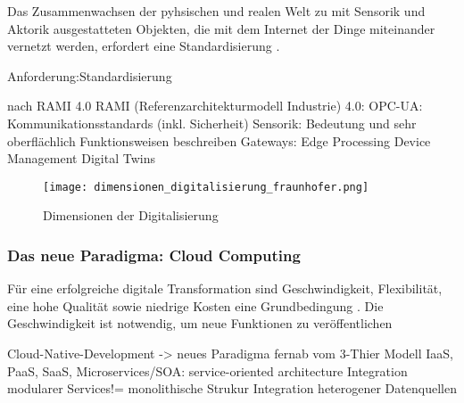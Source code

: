 Das Zusammenwachsen der pyhsischen und realen Welt zu mit Sensorik und Aktorik ausgestatteten Objekten, die mit dem Internet der Dinge miteinander vernetzt werden, erfordert eine Standardisierung \citep{BITKOM2015}.



Anforderung:Standardisierung


nach RAMI 4.0
RAMI (Referenzarchitekturmodell Industrie) 4.0: OPC-UA: Kommunikationsstandards (inkl. Sicherheit)
Sensorik: Bedeutung und sehr oberflächlich Funktionsweisen beschreiben
Gateways: Edge Processing
Device Management
Digital Twins

\begin{figure}[h]
  \texttt{[image: dimensionen\_digitalisierung\_fraunhofer.png]}
  \caption[Dimensionen der Digitalisierung]{Dimensionen der Digitalisierung \citep{FraunhoferISE}}
\end{figure}


\subsubsection{Das neue Paradigma: Cloud Computing}

Für eine erfolgreiche digitale Transformation sind Geschwindigkeit, Flexibilität, eine hohe Qualität
sowie niedrige Kosten eine Grundbedingung \citep{Acharya2019}. Die Geschwindigkeit ist notwendig, um neue Funktionen zu veröffentlichen

Cloud-Native-Development -> neues Paradigma fernab vom 3-Thier Modell
IaaS, PaaS, SaaS, Microservices/SOA: service-oriented architecture
Integration modularer Services!= monolithische Strukur
Integration heterogener Datenquellen
